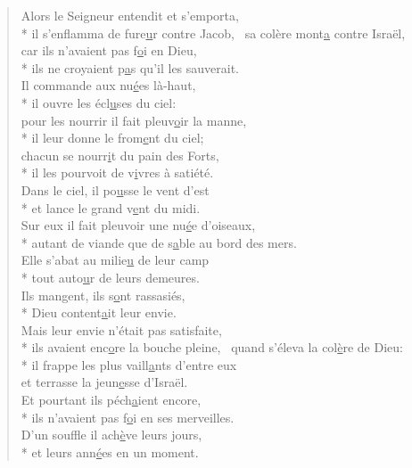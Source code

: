 \begin{verse}
Alors le Seigneur entendit et s’emporta, \\*
il s’enflamma de fure\underline{u}r contre Jacob,~\psalmstar
sa colère mont\underline{a} contre Israël, \\
car ils n’avaient pas f\underline{o}i en Dieu, \\*
ils ne croyaient p\underline{a}s qu’il les sauverait. \\

Il commande aux nu\underline{é}es là-haut, \\*
il ouvre les écl\underline{u}ses du ciel: \\
pour les nourrir il fait pleuv\underline{o}ir la manne, \\*
il leur donne le from\underline{e}nt du ciel; \\
chacun se nourr\underline{i}t du pain des Forts, \\*
il les pourvoit de v\underline{i}vres à satiété. \\

Dans le ciel, il po\underline{u}sse le vent d’est \\*
et lance le grand v\underline{e}nt du midi. \\
Sur eux il fait pleuvoir une nu\underline{é}e d’oiseaux, \\*
autant de viande que de s\underline{a}ble au bord des mers. \\

Elle s’abat au milie\underline{u} de leur camp \\*
tout auto\underline{u}r de leurs demeures. \\
Ils mangent, ils s\underline{o}nt rassasiés, \\*
Dieu content\underline{a}it leur envie. \\

Mais leur envie n’était pas satisfaite, \\*
ils avaient enc\underline{o}re la bouche pleine,~\psalmstar
{}quand s’éleva la col\underline{è}re de Dieu: \\*
il frappe les plus vaill\underline{a}nts d’entre eux \\
et terrasse la jeun\underline{e}sse d’Israël. \\

Et pourtant ils péch\underline{a}ient encore, \\*
ils n’avaient pas f\underline{o}i en ses merveilles. \\
D’un souffle il ach\underline{è}ve leurs jours, \\*
et leurs ann\underline{é}es en un moment. \\


\end{verse}

